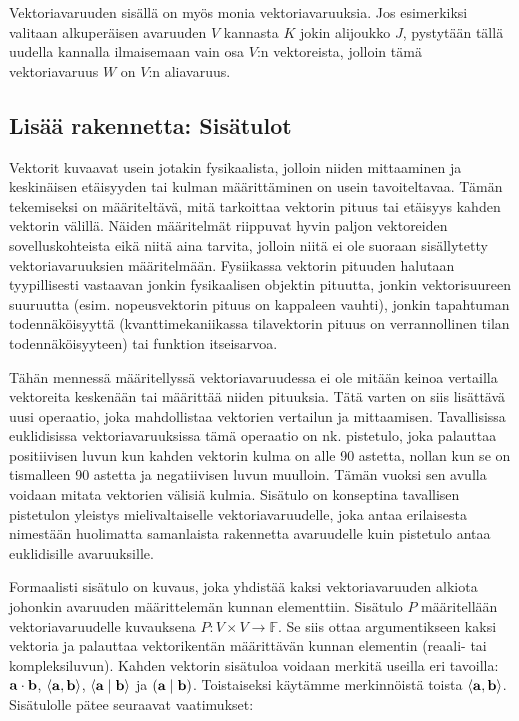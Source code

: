 \documentclass[../johdoksia.tex]{subfiles}
\begin{document}
	Vektoriavaruuden sisällä on myös monia vektoriavaruuksia. Jos esimerkiksi valitaan alkuperäisen avaruuden $V$ kannasta $K$ jokin alijoukko $J$, pystytään tällä uudella kannalla ilmaisemaan vain osa $V$:n vektoreista, jolloin tämä vektoriavaruus $W$ on $V$:n aliavaruus.
	
	\subsection{Lisää rakennetta: Sisätulot}
	
	Vektorit kuvaavat usein jotakin fysikaalista, jolloin niiden mittaaminen ja keskinäisen etäisyyden tai kulman määrittäminen on usein tavoiteltavaa. Tämän tekemiseksi on määriteltävä, mitä tarkoittaa vektorin pituus tai etäisyys kahden vektorin välillä. Näiden määritelmät riippuvat hyvin paljon vektoreiden sovelluskohteista eikä niitä aina tarvita, jolloin niitä ei ole suoraan sisällytetty vektoriavaruuksien määritelmään. Fysiikassa vektorin pituuden halutaan tyypillisesti vastaavan jonkin fysikaalisen objektin pituutta, jonkin vektorisuureen suuruutta (esim. nopeusvektorin pituus on kappaleen vauhti), jonkin tapahtuman todennäköisyyttä (kvanttimekaniikassa tilavektorin pituus on verrannollinen tilan todennäköisyyteen) tai funktion itseisarvoa.
	
	Tähän mennessä määritellyssä vektoriavaruudessa ei ole mitään keinoa vertailla vektoreita keskenään tai määrittää niiden pituuksia. Tätä varten on siis lisättävä uusi operaatio, joka mahdollistaa vektorien vertailun ja mittaamisen. Tavallisissa euklidisissa vektoriavaruuksissa tämä operaatio on nk. pistetulo, joka palauttaa positiivisen luvun kun kahden vektorin kulma on alle 90 astetta, nollan kun se on tismalleen 90 astetta ja negatiivisen luvun muulloin. Tämän vuoksi sen avulla voidaan mitata vektorien välisiä kulmia. Sisätulo on konseptina tavallisen pistetulon yleistys mielivaltaiselle vektoriavaruudelle, joka antaa erilaisesta nimestään huolimatta samanlaista rakennetta avaruudelle kuin pistetulo antaa euklidisille avaruuksille.
	
	Formaalisti sisätulo on kuvaus, joka yhdistää kaksi vektoriavaruuden alkiota johonkin avaruuden määrittelemän kunnan elementtiin. Sisätulo $P$ määritellään vektoriavaruudelle kuvauksena $P: V \times V \to \mathbb{F}$. Se siis ottaa argumentikseen kaksi vektoria ja palauttaa vektorikentän määrittävän kunnan elementin (reaali- tai kompleksiluvun). Kahden vektorin sisätuloa voidaan merkitä useilla eri tavoilla: $\mathbf{a}\cdot\mathbf{b}$, $\langle\mathbf{a}, \mathbf{b}\rangle$, $\langle\mathbf{a}\mid\mathbf{b}\rangle$ ja $(\mathbf{a}\mid\mathbf{b})$. Toistaiseksi käytämme merkinnöistä toista $\langle\mathbf{a}, \mathbf{b}\rangle$. Sisätulolle pätee seuraavat vaatimukset:
	
\end{document}

